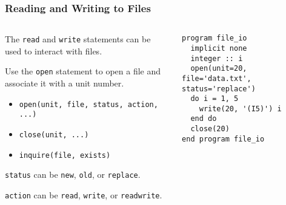 \begin{frame}[fragile]
  \frametitle{Reading and Writing to Files}

      \begin{columns}[T]
    \begin{column}{0.55\textwidth}

    The \texttt{read} and \texttt{write} statements can be used to interact with files.
  \vspace*{2mm}

    Use the \texttt{open} statement to open a file and associate it with a unit number.

  \begin{itemize}
    \item \texttt{open(unit, file, status, action, ...)}
    \item \texttt{close(unit, ...)}
    \item \texttt{inquire(file, exists)}
  \end{itemize}

  \vspace*{2mm}
 \texttt{status} can be \texttt{new}, \texttt{old}, or \texttt{replace}.

   \vspace*{2mm}
  \texttt{action} can be \texttt{read}, \texttt{write}, or \texttt{readwrite}.
        \end{column}
    \begin{column}{0.45\textwidth}
  \begin{lstlisting}
program file_io
  implicit none
  integer :: i
  open(unit=20, file='data.txt', status='replace')
  do i = 1, 5
    write(20, '(I5)') i
  end do
  close(20)
end program file_io
  \end{lstlisting}
    \end{column}
    \end{columns}


\end{frame}



